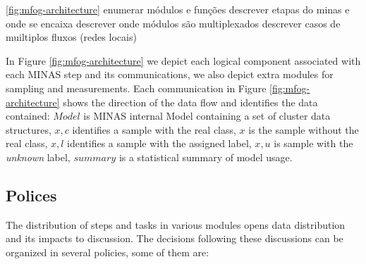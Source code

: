 

\ref{fig:mfog-architecture}
enumerar módulos e funções
descrever etapas do minas e onde se encaixa
descrever onde módulos são multiplexados
descrever casos de muiltiplos fluxos (redes locais)

In Figure \ref{fig:mfog-architecture} we depict each logical component associated
with each MINAS step and its communications, we also depict extra modules for sampling
and measurements.
Each communication in Figure \ref{fig:mfog-architecture} shows the direction of the data flow
and identifies the data contained:
$Model$ is MINAS internal Model containing a set of cluster data structures,
$x,c$ identifies a sample with the real class,
$x$ is the sample without the real class,
$x,l$ identifies a sample with the assigned label,
$x,u$ is  sample with the \emph{unknown} label,
$summary$ is a statistical summary of model usage.

\subsection{Polices}\label{sec:polices}

The distribution of steps and tasks in various modules opens
data distribution and its impacts to discussion.
The decisions following these discussions can be organized in
several policies, some of them are:


